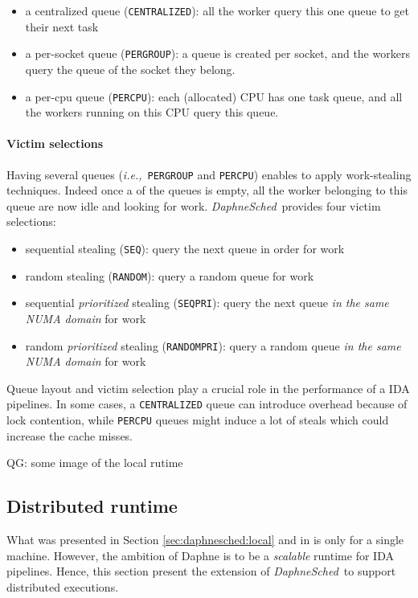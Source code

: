 \documentclass[conference,10pt,a4paper]{IEEEtran}
\newcommand{\ie}{\emph{i.e.,}}
\newcommand{\ds}{\emph{DaphneSched}}
\newcommand{\qg}[1]{{\color{blue} QG: #1}} %
\begin{document}
\begin{itemize}
\item a centralized queue (\texttt{CENTRALIZED}): all the worker query this one queue to get their next task
\item a per-socket queue (\texttt{PERGROUP}): a queue is created per socket, and the workers query the queue of the socket they belong. 
\item a per-cpu queue (\texttt{PERCPU}): each (allocated) CPU has one task queue, and all the workers running on this CPU query this queue.
\end{itemize}

\paragraph{Victim selections}

Having several queues (\ie\ \texttt{PERGROUP} and \texttt{PERCPU}) enables to apply work-stealing techniques.
Indeed once a of the queues is empty, all the worker belonging to this queue are now idle and looking for work.
\ds\ provides four victim selections:

\begin{itemize}
\item sequential stealing (\texttt{SEQ}): query the next queue in order for work
\item random stealing (\texttt{RANDOM}): query a random queue for work
\item sequential \emph{prioritized} stealing (\texttt{SEQPRI}): query the next queue \emph{in the same NUMA domain} for work
\item random \emph{prioritized} stealing (\texttt{RANDOMPRI}): query a random queue \emph{in the same NUMA domain} for work
\end{itemize}

Queue layout and victim selection play a crucial role in the performance of a IDA pipelines.
In some cases, a \texttt{CENTRALIZED} queue can introduce overhead because of lock contention, while \texttt{PERCPU} queues might induce a lot of steals which could increase the cache misses.

\qg{some image of the local rutime}

\subsection{Distributed runtime}

What was presented in Section \ref{sec:daphnesched:local} and in \cite{eleliemy2023daphnesched} is only for a single machine.
However, the ambition of Daphne is to be a \emph{scalable} runtime for IDA pipelines.
Hence, this section present the extension of \ds\ to support distributed executions.
\end{document}
